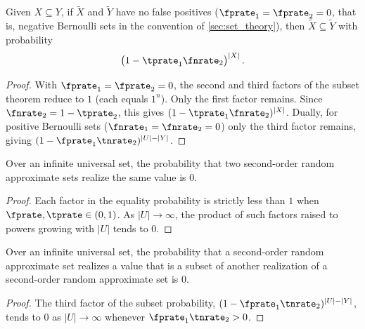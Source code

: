 \begin{corollary}
	Given $X \subseteq Y$, if $\tilde{X}$ and $\tilde{Y}$ have no false positives ($\fprate_1 = \fprate_2 = 0$, that is, negative Bernoulli sets in the convention of \cref{sec:set_theory}), then $\tilde{X} \subseteq \tilde{Y}$ with probability
	\begin{equation}
	\left(1 - \tprate_1\fnrate_2\right)^{|X|}.
	\end{equation}
\end{corollary}
\begin{proof}
With $\fprate_1 = \fprate_2 = 0$, the
second and third factors of the subset theorem reduce to $1$ (each equals $1^n$).
Only the first factor remains.
Since $\fnrate_2 = 1 - \tprate_2$, this gives $(1 - \tprate_1 \fnrate_2)^{|X|}$.
Dually, for positive Bernoulli sets ($\fnrate_1 = \fnrate_2 = 0$) only the third factor remains, giving $(1 - \fprate_1 \tnrate_2)^{|U| - |Y|}$.
\end{proof}




\begin{corollary}
	Over an infinite universal set, the probability that two second-order random approximate sets realize the same value is $0$.
\end{corollary}
\begin{proof}
Each factor in the equality probability is strictly less than $1$
when $\fprate, \tprate \in (0,1)$. As $|U| \to \infty$, the product
of such factors raised to powers growing with $|U|$ tends to $0$.
\end{proof}

\begin{corollary}
	Over an infinite universal set, the probability that a second-order random approximate set realizes a value that is a subset of another realization of a second-order random approximate set is $0$.
\end{corollary}
\begin{proof}
The third factor of the subset probability,
$(1 - \fprate_1 \tnrate_2)^{|U|-|Y|}$, tends to $0$ as $|U| \to \infty$
whenever $\fprate_1 \tnrate_2 > 0$.
\end{proof}




